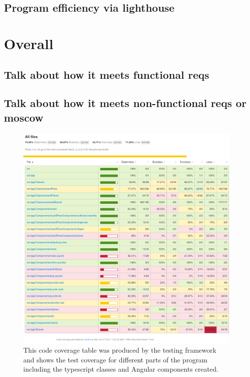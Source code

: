 \documentclass{l4proj}
\begin{document}
\subsection{Program efficiency via lighthouse}

\section{Overall}
\subsection{Talk about how it meets functional reqs}
\subsection{Talk about how it meets non-functional reqs or moscow}




\begin{figure}
    \centering
    \includegraphics[width=1\linewidth]{images/codeCoverage.png}    

    \caption{ This code coverage table was produced by the testing framework and shows the test coverage for different parts of the program including the typescript classes and Angular components created. 
    }

    \label{fig:codeCoverage} 
\end{figure}
\end{document}
